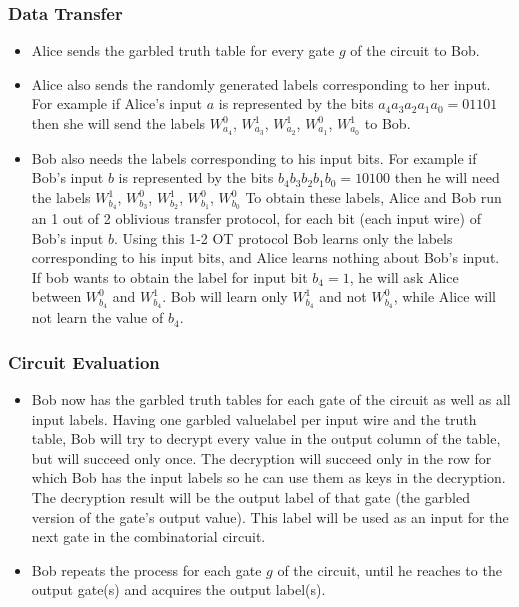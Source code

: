 \subsubsection{Data Transfer}\label{sss:data-transfer}
\begin{itemize}
  \item Alice sends the garbled truth table for every gate $g$ of the circuit to Bob.
  \item Alice also sends the randomly generated labels corresponding to her input.
  For example if Alice's input $a$ is represented by the bits $a_4a_3a_2a_1a_0 = 01101$ then she will send the labels $W_{a_4}^0$, $W_{a_3}^1$, $W_{a_2}^1$, $W_{a_1}^0$, $W_{a_0}^1$ to Bob.
  \item Bob also needs the labels corresponding to his input bits. For example if Bob's input $b$ is represented by the bits $b_4b_3b_2b_1b_0 = 10100$ then he will need the labels $W_{b_4}^1$, $W_{b_3}^0$, $W_{b_2}^1$, $W_{b_1}^0$, $W_{b_0}^0$
  To obtain these labels, Alice and Bob run an 1 out of 2 oblivious transfer protocol, for each bit (each input wire) of Bob's input $b$.
  Using this 1-2 OT protocol Bob learns only the labels corresponding to his input bits, and Alice learns nothing about Bob's input.
  If bob wants to obtain the label for input bit $b_4 = 1$, he will ask Alice between $W_{b_4}^0$ and $W_{b_4}^1$.
  Bob will learn only $W_{b_4}^1$ and not $W_{b_4}^0$, while Alice will not learn the value of $b_4$.
\end{itemize}

\subsubsection{Circuit Evaluation}\label{sss:circuit-evaluation}
\begin{itemize}
  \item Bob now has the garbled truth tables for each gate of the circuit as well as all input labels. Having one garbled value\myslash label per input wire and the truth table, Bob will try to decrypt every value in the output column of the table, but will succeed only once.
  The decryption will succeed only in the row for which Bob has the input labels so he can use them as keys in the decryption.
  The decryption result will be the output label of that gate (the garbled version of the gate's output value).
  This label will be used as an input for the next gate in the combinatorial circuit.
  \item Bob repeats the process for each gate $g$ of the circuit, until he reaches to the output gate(s) and acquires the output label(s).
\end{itemize}

